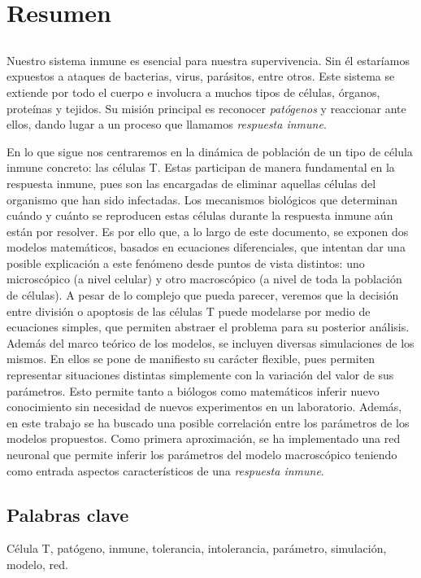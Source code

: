 \chapter*{Resumen}

\section*{\tituloPortadaVal}

Nuestro sistema inmune es esencial para nuestra supervivencia. Sin él estaríamos expuestos a ataques de bacterias, virus, parásitos, entre otros. Este sistema se extiende por todo el cuerpo e involucra a muchos tipos de células, órganos, proteínas y tejidos. Su misión principal es reconocer \textit{patógenos} y reaccionar ante ellos, dando lugar a un proceso que llamamos \textit{respuesta inmune}. 

En lo que sigue nos centraremos en la dinámica de población de un tipo de célula inmune concreto: las células T. Estas participan de manera fundamental en la respuesta inmune, pues son las encargadas de eliminar aquellas células del organismo que han sido infectadas. Los mecanismos biológicos que determinan cuándo y cuánto se reproducen estas células durante la respuesta inmune aún están por resolver. Es por ello que, a lo largo de este documento, se exponen dos modelos matemáticos, basados en ecuaciones diferenciales, que intentan dar una posible explicación a este fenómeno desde puntos de vista distintos: uno microscópico (a nivel celular) y otro macroscópico (a nivel de toda la población de células). A pesar de lo complejo que pueda parecer, veremos que la decisión entre división o apoptosis de las células T puede modelarse por medio de ecuaciones simples, que permiten abstraer el problema para su posterior análisis. Además del marco teórico de los modelos, se incluyen diversas simulaciones de los mismos. En ellos se pone de manifiesto su carácter flexible, pues permiten representar situaciones distintas simplemente con la variación del valor de sus parámetros. Esto permite tanto a biólogos como matemáticos inferir nuevo conocimiento sin necesidad de nuevos experimentos en un laboratorio. Además, en este trabajo se ha buscado una posible correlación entre los parámetros de los modelos propuestos. Como primera aproximación, se ha implementado una red neuronal que permite inferir los parámetros del modelo macroscópico teniendo como entrada aspectos característicos de una \textit{respuesta inmune}.



\section*{Palabras clave}
   

\noindent Célula T, patógeno, inmune, tolerancia, intolerancia, parámetro, simulación, modelo, red.

   


